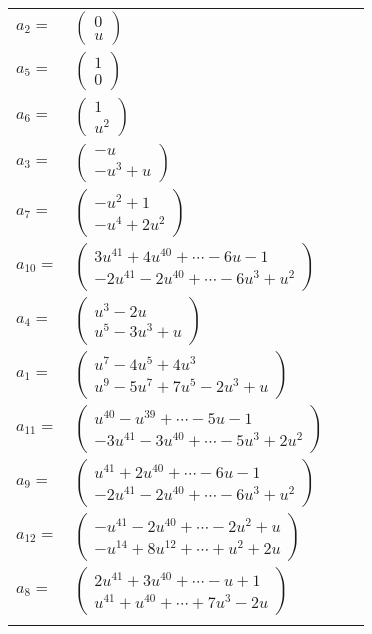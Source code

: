 \documentclass[1p]{elsarticle_modified}
\theoremstyle{definition}
\begin{document}
\begin{tabular}{m{7pt} m{180pt} m{7pt} m{180pt} }
\flushright $a_{2}=$&$\begin{pmatrix}0\\u\end{pmatrix}$ \\
\flushright $a_{5}=$&$\begin{pmatrix}1\\0\end{pmatrix}$ \\
\flushright $a_{6}=$&$\begin{pmatrix}1\\u^2\end{pmatrix}$ \\
\flushright $a_{3}=$&$\begin{pmatrix}- u\\- u^3+u\end{pmatrix}$ \\
\flushright $a_{7}=$&$\begin{pmatrix}- u^2+1\\- u^4+2 u^2\end{pmatrix}$ \\
\flushright $a_{10}=$&$\begin{pmatrix}3 u^{41}+4 u^{40}+\cdots-6 u-1\\-2 u^{41}-2 u^{40}+\cdots-6 u^3+u^2\end{pmatrix}$ \\
\flushright $a_{4}=$&$\begin{pmatrix}u^3-2 u\\u^5-3 u^3+u\end{pmatrix}$ \\
\flushright $a_{1}=$&$\begin{pmatrix}u^7-4 u^5+4 u^3\\u^9-5 u^7+7 u^5-2 u^3+u\end{pmatrix}$ \\
\flushright $a_{11}=$&$\begin{pmatrix}u^{40}- u^{39}+\cdots-5 u-1\\-3 u^{41}-3 u^{40}+\cdots-5 u^3+2 u^2\end{pmatrix}$ \\
\flushright $a_{9}=$&$\begin{pmatrix}u^{41}+2 u^{40}+\cdots-6 u-1\\-2 u^{41}-2 u^{40}+\cdots-6 u^3+u^2\end{pmatrix}$ \\
\flushright $a_{12}=$&$\begin{pmatrix}- u^{41}-2 u^{40}+\cdots-2 u^2+u\\- u^{14}+8 u^{12}+\cdots+u^2+2 u\end{pmatrix}$ \\
\flushright $a_{8}=$&$\begin{pmatrix}2 u^{41}+3 u^{40}+\cdots- u+1\\u^{41}+u^{40}+\cdots+7 u^3-2 u\end{pmatrix}$\\&\end{tabular}
\end{document}
